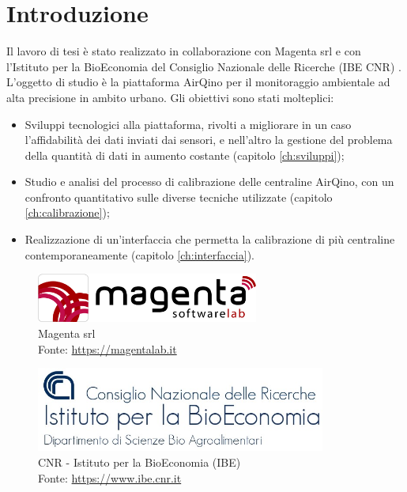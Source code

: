 \chapter{Introduzione}\label{ch:introduzione}
Il lavoro di tesi è stato realizzato in collaborazione con Magenta srl \cite{magenta} e con l'Istituto per la BioEconomia del Consiglio Nazionale delle Ricerche (IBE CNR) \cite{ibe}.\\

L'oggetto di studio è la piattaforma AirQino \cite{airqino} per il monitoraggio ambientale ad alta precisione in ambito urbano. Gli obiettivi sono stati molteplici:
\begin{itemize}
  \item Sviluppi tecnologici alla piattaforma, rivolti a migliorare in un caso l'affidabilità dei dati inviati dai sensori, e nell'altro la gestione del problema della quantità di dati in aumento costante (capitolo \ref{ch:sviluppi});
  \item Studio e analisi del processo di calibrazione delle centraline AirQino, con un confronto quantitativo sulle diverse tecniche utilizzate (capitolo \ref{ch:calibrazione});
  \item Realizzazione di un'interfaccia che permetta la calibrazione di più centraline contemporaneamente  (capitolo \ref{ch:interfaccia}).
\end{itemize}

\begin{figure}[H]
\centering
\captionsetup{justification=centering}
\includegraphics[width=0.65\textwidth,height=\textheight,keepaspectratio]{img/magenta}
\caption{Magenta srl\\Fonte: \url{https://magentalab.it}}
\label{fig:magenta}
\end{figure}

\vspace{3mm}
\begin{figure}[H]
\centering
\captionsetup{justification=centering}
\includegraphics[width=0.85\textwidth,height=\textheight,keepaspectratio]{img/ibe.jpg}
\caption{CNR - Istituto per la BioEconomia (IBE)\\Fonte: \url{https://www.ibe.cnr.it}}
\label{fig:ibe}
\end{figure}

